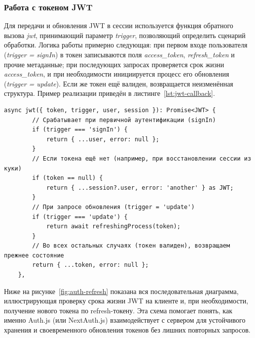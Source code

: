 \subsubsection{Работа с токеном JWT}
Для передачи и обновления JWT в сессии используется функция обратного вызова \textit{jwt}, принимающий параметр \textit{trigger}, позволяющий определить сценарий обработки. Логика работы примерно следующая: при первом входе пользователя (\textit{trigger = signIn}) в токен записываются поля \textit{access\_token}, \textit{refresh\_token} и прочие метаданные; при последующих запросах проверяется срок жизни \textit{access\_token}, и при необходимости инициируется процесс его обновления (\textit{trigger = update}). Если же токен ещё валиден, возвращается неизменённая структура. Пример реализации приведён в листинге~\ref{lst:jwt-callback}.

\begin{lstlisting}[caption={JWT-callback с учётом trigger}, label={lst:jwt-callback}]
	async jwt({ token, trigger, user, session }): Promise<JWT> {
		// Срабатывает при первичной аутентификации (signIn)
		if (trigger === 'signIn') {
			return { ...user, error: null };
		}
		// Если токена ещё нет (например, при восстановлении сессии из куки)
		if (token == null) {
			return { ...session?.user, error: 'another' } as JWT;
		}
		// При запросе обновления (trigger = 'update')
		if (trigger === 'update') {
			return await refreshingProcess(token);
		}
		// Во всех остальных случаях (токен валиден), возвращаем прежнее состояние
		return { ...token, error: null };
	},
\end{lstlisting}

Ниже на рисунке~\ref{fig:auth-refresh} показана вся последовательная диаграмма, иллюстрирующая проверку срока жизни JWT на клиенте и, при необходимости, получение нового токена по refresh-токену. Эта схема помогает понять, как именно Auth.js (или NextAuth.js) взаимодействует с сервером для устойчивого хранения и своевременного обновления токенов без лишних повторных запросов.

